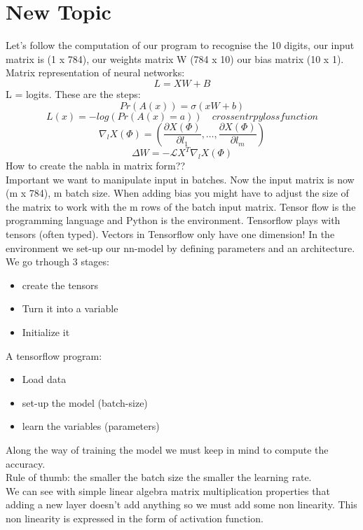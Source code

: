 \section{New Topic}
Let's follow the computation of our program to recognise the 10 digits, our input matrix is (1 x 784), our weights matrix W (784 x 10) our bias matrix (10 x 1).\\
Matrix representation of neural networks:
\[ 
     L = XW + B
\]L = logits. These are the steps:\[ 
    Pr(A(x)) = \sigma(xW +b) 
\]
\[ 
    L(x) = -log(Pr(A(x)=a)) \quad cross entrpy loss function
\]
\[ 
    \nabla_l X(\Phi) = \left( \frac{\partial X(\Phi)}{\partial l_1}, \ldots, \frac{\partial X(\Phi)}{\partial l_m} \right) 
\]
\[ 
    \Delta W = -\mathcal{L}X^T\nabla_l X(\Phi) 
\]How to create the nabla in matrix form??\\
Important we want to manipulate input in batches. Now the input matrix is now (m x 784), m batch size. When adding bias you might have to adjust the size of the matrix to work with the m rows of the batch input matrix. Tensor flow is the programming language and Python is the environment. Tensorflow plays with tensors (often typed). Vectors in Tensorflow only have one dimension! In the environment we set-up our nn-model by defining parameters and an architecture. We go trhough 3 stages: 
\begin{itemize}
    \item create the tensors
    \item Turn it into a variable
    \item Initialize it
\end{itemize}
A tensorflow program:
\begin{itemize}
    \item Load data
    \item set-up the model (batch-size)
    \item learn the variables (parameters)
\end{itemize}
Along the way of training the model we must keep in mind to compute the accuracy.\\ Rule of thumb: the smaller the batch size the smaller the learning rate.\\
We can see with simple linear algebra matrix multiplication properties that adding a new layer doesn't add anything so we must add some non linearity. This non linearity is expressed in the form of activation function. 
